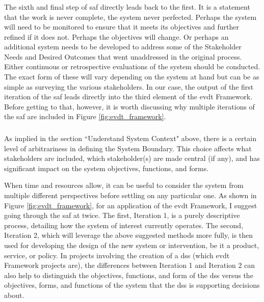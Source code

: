 \subsubsection{}

The sixth and final step of \ac{saf} directly leads back to the first. It is a statement that the work is never complete, the system never perfected. Perhaps the system will need to be monitored to ensure that it meets its objectives and further refined if it does not. Perhaps the objectives will change. Or perhaps an additional system needs to be developed to address some of the Stakeholder Needs and Desired Outcomes that went unaddressed in the original process. Either continuous or retrospective evaluations of the system should be conducted. The exact form of these will vary depending on the system at hand but can be as simple as surveying the various stakeholders. In our case, the output of the first iteration of the \ac{saf} leads directly into the third element of the \ac{evdt} Framework. Before getting to that, however, it is worth discussing why multiple iterations of the \ac{saf} are included in Figure \ref{fig:evdt_framework}.

\subsubsection{}

As implied in the section ``Understand System Context" above, there is a certain level of arbitrariness in defining the System Boundary. This choice affects what stakeholders are included, which stakeholder(s) are made central (if any), and has significant impact on the system objectives, functions, and forms.

When time and resources allow, it can be useful to consider the system from multiple different perspectives before settling on any particular one. As shown in Figure \ref{fig:evdt_framework}, for an application of the \ac{evdt} Framework, I suggest going through the \ac{saf} at twice. The first, Iteration 1, is a purely descriptive process, detailing how the system of interest currently operates.  The second, Iteration 2, which will leverage the above suggested methods more fully, is then used for developing the design of the new system or intervention, be it a product, service, or policy. In projects involving the creation of a \ac{dss} (which \ac{evdt} Framework projects are), the differences between Iteration 1 and Iteration 2 can also help to distinguish the objectives, functions, and form of the \ac{dss} versus the objectives, forms, and functions of the system that the \ac{dss} is supporting decisions about.

